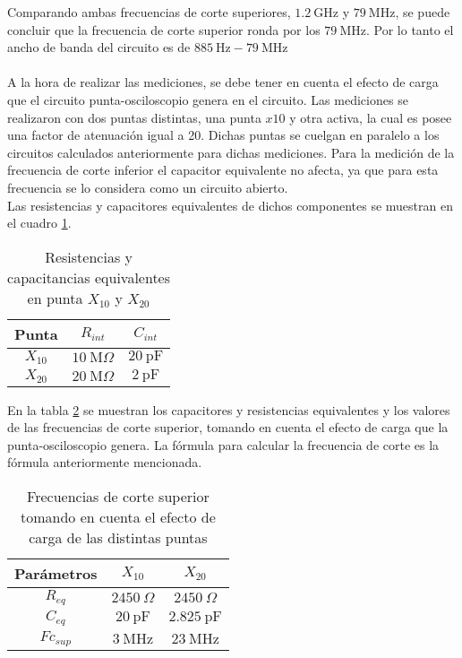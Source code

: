 \documentclass[a4paper,10pt]{article}
\begin{document}
				\indent Comparando ambas frecuencias de corte superiores, $1.2~\text{GHz}$ y $79~\text{MHz}$, se puede concluir que la frecuencia de corte superior ronda 
				por los $79~\text{MHz}$. Por lo tanto el ancho de banda del circuito es de $885~\text{Hz} - 79~\text{MHz}$ \\ \\
				\indent A la hora de realizar las mediciones, se debe tener en cuenta el efecto de carga que el circuito punta-osciloscopio genera en el circuito. 
				Las mediciones se realizaron con dos puntas distintas, una punta $x10$ y otra activa, la cual es posee una factor de atenuación igual a 20. Dichas 
				puntas se cuelgan en paralelo a los circuitos calculados anteriormente para dichas mediciones. Para la medición de la frecuencia de corte inferior 
				el capacitor equivalente no afecta, ya que para esta frecuencia se lo considera como un circuito abierto. \\
				\indent Las resistencias y capacitores equivalentes de dichos componentes se muestran en el cuadro \ref{tab004}.
				
				\begin{table}[!htb]
				\centering
					\begin{tabular}{|c|c|c|}
						\hline
						Punta & $R_{int}$ & $C_{int}$ \\
						\hline
						$X_{10}$ & $10~\text{M}\Omega$ & $20~\text{pF}$\\
						\hline
						$X_{20}$ & $20~\text{M}\Omega$ & $2~\text{pF}$\\
						\hline
					\end{tabular}
				\caption{Resistencias y capacitancias equivalentes en punta $X_{10}$ y $X_{20}$} \label{tab004}
				\end{table}
				
				\indent En la tabla \ref{tab005} se muestran los capacitores y resistencias equivalentes y los valores de las frecuencias de corte superior, 
				tomando en cuenta el efecto de carga que la punta-osciloscopio genera. La fórmula para calcular la frecuencia de corte es la fórmula anteriormente 
				mencionada. \\
				
				\begin{table}[!htb]
				\centering
					\begin{tabular}{|c|c|c|}
						\hline
						Parámetros & $X_{10}$ & $X_{20}$ \\
						\hline
						$R_{eq}$ & $2450~\Omega$ & $2450~\Omega$ \\
						\hline
						$C_{eq}$ & $20~\text{pF}$ & $2.825~\text{pF}$ \\
						\hline
						$Fc_{sup}$ & $3~\text{MHz}$ & $23~\text{MHz}$\\
						\hline
					\end{tabular}
				\caption{Frecuencias de corte superior tomando en cuenta el efecto de carga de las distintas puntas} \label{tab005}
				\end{table}
				
\end{document}
